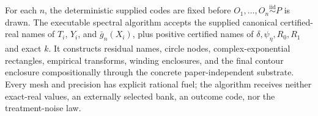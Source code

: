 For each \(n\), the deterministic supplied codes are fixed before \(O_1,\ldots,O_n\stackrel{\mathrm{iid}}{\sim}P\) is drawn.  The executable spectral algorithm accepts the supplied canonical certified-real names of \(T_i\), \(Y_i\), and \(\bar g_n(X_i)\), plus positive certified names of \(\delta,\psi_{\eta},R_0,R_1\) and exact \(k\).  It constructs residual names, circle nodes, complex-exponential rectangles, empirical transforms, winding enclosures, and the final contour enclosure compositionally through the concrete paper-independent substrate.  Every mesh and precision has explicit rational fuel; the algorithm receives neither exact-real values, an externally selected bank, an outcome code, nor the treatment-noise law.